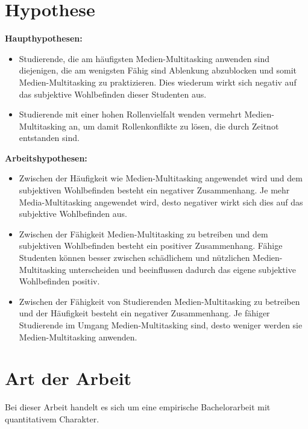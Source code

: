 \section*{Hypothese}\label{section.hypothesen}
\textbf{Haupthypothesen:}
\begin{itemize}
    \item Studierende, die am häufigsten Medien-Multitasking anwenden sind diejenigen, die am wenigsten Fähig sind Ablenkung abzublocken und somit Medien-Multitasking zu praktizieren. Dies wiederum wirkt sich negativ auf das subjektive Wohlbefinden dieser Studenten aus. 
     \item Studierende mit einer hohen Rollenvielfalt wenden vermehrt Medien-Multitasking an, um damit Rollenkonflikte zu lösen, die durch Zeitnot entstanden sind.
\end{itemize}
\textbf{Arbeitshypothesen:}
\begin{itemize}
    \item Zwischen der Häufigkeit wie Medien-Multitasking angewendet wird und dem subjektiven Wohlbefinden besteht ein negativer Zusammenhang. Je mehr Media-Multitasking angewendet wird, desto negativer wirkt sich dies auf das subjektive Wohlbefinden aus.
    \item Zwischen der Fähigkeit Medien-Multitasking zu betreiben und dem subjektiven Wohlbefinden besteht ein positiver Zusammenhang. Fähige Studenten können besser zwischen schädlichem und nützlichen Medien-Multitasking unterscheiden und beeinflussen dadurch das eigene subjektive Wohlbefinden positiv.
    \item Zwischen der Fähigkeit von Studierenden Medien-Multitasking zu betreiben und der Häufigkeit besteht ein negativer Zusammenhang. Je fähiger Studierende im Umgang Medien-Multitasking sind, desto weniger werden sie Medien-Multitasking anwenden.
\end{itemize}
\section*{Art der Arbeit}\label{section.artArbeit}
Bei dieser Arbeit handelt es sich um eine empirische Bachelorarbeit mit quantitativem Charakter. 
